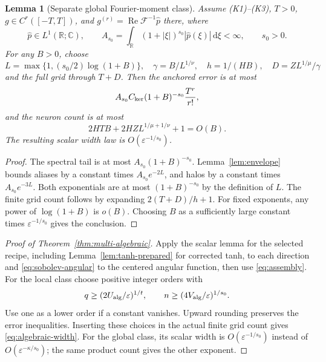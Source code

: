 \documentclass[11pt,letterpaper]{article}
\newcommand{\R}{\mathbb R}
\newcommand{\C}{\mathbb C}
\newcommand{\dd}{\,\mathrm d}
\newcommand{\eps}{\varepsilon}
\newtheorem{lemma}{Lemma}[section]
\theoremstyle{definition}
\theoremstyle{remark}
\begin{document}
\begin{lemma}[Separate global Fourier-moment class]\label{thm:global-algebraic}
Assume (K1)--(K3), \(T>0\), \(g\in C^r([-T,T])\), and
\(g^{(r)}=\operatorname{Re}\mathcal F^{-1}\widehat p\) there, where
\[
 \widehat p\in L^1(\R;\C),\qquad
 A_{s_0}=\int_\R(1+|\xi|)^{s_0}|\widehat p(\xi)|\dd\xi<\infty,\qquad s_0>0.
\]
For any \(B>0\), choose
\[
 L=\max\{1,(s_0/2)\log(1+B)\},\quad
 \gamma=B/L^{1/\nu},\quad h=1/(HB),\quad D=ZL^{1/\mu}/\gamma
\]
and the full grid through \(T+D\).
Then the anchored error is at most
\[
 A_{s_0}C_{\rm ker}(1+B)^{-s_0}\frac{T^r}{r!},
\]
and the neuron count is at most
\[
 2HTB+2HZL^{1/\mu+1/\nu}+1=O(B).
\]
The resulting scalar width law is \(O(\eps^{-1/s_0})\).
\end{lemma}
\begin{proof}
The spectral tail is at most \(A_{s_0}(1+B)^{-s_0}\).
Lemma~\ref{lem:envelope} bounds aliases by a constant times
\(A_{s_0}e^{-2L}\), and halos by a constant times \(A_{s_0}e^{-3L}\).
Both exponentials are at most \((1+B)^{-s_0}\) by the definition of \(L\).
The finite grid count follows by expanding \(2(T+D)/h+1\).
For fixed exponents, any power of \(\log(1+B)\) is \(o(B)\).
Choosing \(B\) as a sufficiently large constant times
\(\eps^{-1/s_0}\) gives the conclusion.
\end{proof}


\begin{proof}[Proof of Theorem~\ref{thm:multi-algebraic}]
Apply the scalar lemma for the selected recipe, including
Lemma~\ref{lem:tanh-prepared} for corrected tanh, to each direction and
\eqref{eq:sobolev-angular} to the centered angular function, then use
\eqref{eq:assembly}. For the local class choose positive integer orders with
\[
 q\ge(2U_{\rm alg}/\eps)^{1/t},\qquad
 n\ge(4V_{\rm alg}/\eps)^{1/s_0}.
\]
Use one as a lower order if a constant vanishes. Upward rounding preserves
the error inequalities. Inserting these choices in the actual finite grid
count gives \eqref{eq:algebraic-width}.
For the global class, its scalar width is \(O(\eps^{-1/s_0})\) instead of
\(O(\eps^{-\kappa/s_0})\); the same product count gives the other exponent.
\end{proof}
\end{document}
